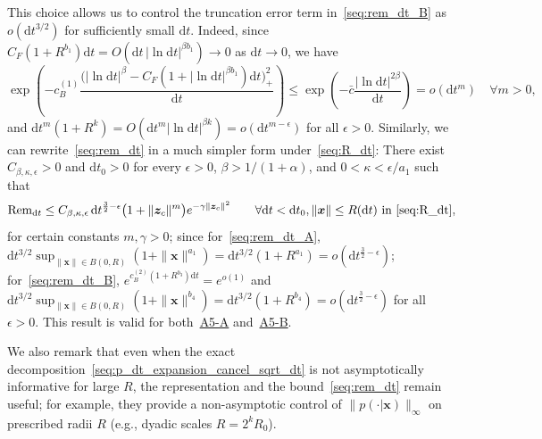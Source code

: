 This choice allows us to control the truncation error term in~\eqref{seq:rem_dt_B} as $o(\mathrm dt^{3/2})$ for sufficiently small $\mathrm dt$. Indeed, since $C_F(1+R^{b_1})\mathrm dt=O(\mathrm dt\,|\ln\mathrm dt|^{\beta b_1})\rightarrow0$ as $\mathrm dt\rightarrow 0$, we have
\begin{equation*}
    \exp\!\!\left(-c_B^{(1)}\frac{\big(|\ln \mathrm dt|^\beta
    -C_F(1+|\ln \mathrm dt|^{\beta b_1})\mathrm dt
    \big)_+^2}{\mathrm dt}\right)
    \leq \exp\left(-\bar c\frac{|\ln \mathrm dt|^{2\beta}}{\mathrm dt}\right)
    = o(\mathrm dt^m)
    \quad\forall m>0,
\end{equation*}
and $\mathrm dt^m(1+R^k)=O(\mathrm dt^m\mathrm |\ln\mathrm dt|^{\beta k})=o(\mathrm dt^{m-\epsilon})$ for all $\epsilon>0$.
Similarly, we can rewrite~\eqref{seq:rem_dt} in a much simpler form under~\eqref{seq:R_dt}: There exist $C_{\beta,\kappa,\epsilon}>0$ and $\mathrm dt_0>0$ for every $\epsilon>0$, $\beta>1/(1+\alpha)$, and $0<\kappa<\epsilon/a_1$ such that
\begin{equation}
  \mathrm{Rem}_{\mathrm dt}
  \leq C_{\beta,\kappa,\epsilon}\,
  \mathrm dt^{\frac{3}{2}-\epsilon}
  \big(1+\|\bm z_c\|^m\big)
  e^{-\gamma\|\bm z_c\|^2}
  \qquad\forall
  \mathrm dt<\mathrm dt_0,
  \|\bm x\|\leq R(\mathrm dt)\text{ in~\eqref{seq:R_dt}},
  \label{seq:rem_dt_Rdt_choosen}
\end{equation}
for certain constants $m,\gamma>0$; since for~\eqref{seq:rem_dt_A}, $\mathrm dt^{3/2}\sup_{\|\bm x\|\in B(0,R)}(1+\|\bm x\|^{a_1})=\mathrm dt^{3/2}(1+R^{a_1})=o(\mathrm dt^{\frac{3}{2}-\epsilon})$;
for~\eqref{seq:rem_dt_B}, $e^{c_{B}^{(2)}(1+R^{b_3})\mathrm dt}=e^{o(1)}$ and $\mathrm dt^{3/2}\sup_{\|\bm x\|\in B(0,R)}(1+\|\bm x\|^{b_4})=\mathrm dt^{3/2}(1+R^{b_4})=o(\mathrm dt^{\frac{3}{2}-\epsilon})$ for all $\epsilon>0$. This result is valid for both~\hyperlink{assumption:A5-A}{A5-A} and~\hyperlink{assumption:A5-B}{A5-B}. 

We also remark that even when the exact decomposition~\eqref{seq:p_dt_expansion_cancel_sqrt_dt} is not asymptotically informative for large $R$, the representation and the bound~\eqref{seq:rem_dt} remain useful; for example, they provide a non-asymptotic control of $\|p(\cdot|\bm x)\|_\infty$ on prescribed radii $R$ (e.g., dyadic scales $R=2^k R_0$).

